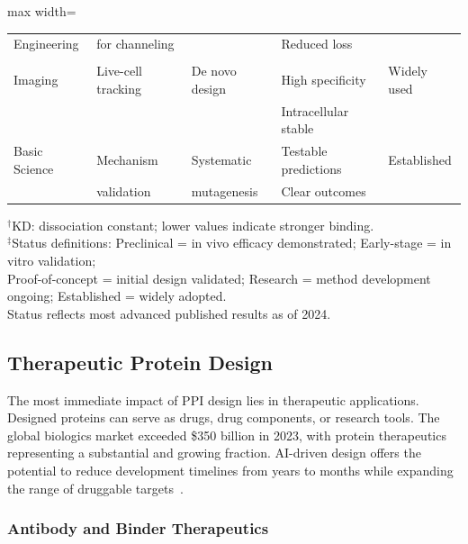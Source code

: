 \begin{table}[h]
\begin{adjustbox}{max width=\textwidth}
\begin{tabular}{@{}p{2cm}p{2.5cm}p{2cm}p{3cm}p{2cm}@{}}
Engineering & for channeling & & Reduced loss & \\
\addlinespace
\multicolumn{5}{l}{\textit{Research Tools}} \\
\addlinespace
Imaging & Live-cell tracking & De novo design & High specificity & Widely used \\
& & & Intracellular stable & \\
\addlinespace
Basic Science & Mechanism & Systematic & Testable predictions & Established \\
& validation & mutagenesis & Clear outcomes & \\
\bottomrule
\end{tabular}
\end{adjustbox}
\begin{flushleft}
\footnotesize{$^\dagger$KD: dissociation constant; lower values indicate stronger binding.}\\
\footnotesize{$^\ddagger$Status definitions: Preclinical = in vivo efficacy demonstrated; Early-stage = in vitro validation;}\\
\footnotesize{\hspace{3.7cm}Proof-of-concept = initial design validated; Research = method development ongoing; Established = widely adopted.}\\
\footnotesize{\hspace{3.7cm}Status reflects most advanced published results as of 2024.}
\end{flushleft}
\end{table}

\subsection{Therapeutic Protein Design}
\label{subsec:therapeutics}

The most immediate impact of PPI design lies in therapeutic applications. Designed proteins can serve as drugs, drug components, or research tools. The global biologics market exceeded \$350 billion in 2023, with protein therapeutics representing a substantial and growing fraction. AI-driven design offers the potential to reduce development timelines from years to months while expanding the range of druggable targets~\cite{trepte2024ai}.

\subsubsection{Antibody and Binder Therapeutics}

